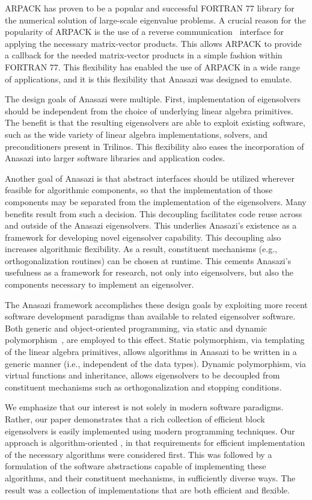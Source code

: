 \documentclass[acmtoms]{acmtrans2m}
\newcounter{algorithm}
\begin{document}
ARPACK has proven to be a popular and successful FORTRAN 77 library for the numerical
solution of large-scale eigenvalue problems. A crucial reason for the popularity of ARPACK
is the use of a reverse communication~\cite[p.~3]{lesy:98} interface for applying the
necessary matrix-vector products. This allows ARPACK to provide a callback for the needed
matrix-vector products in a simple fashion within FORTRAN 77. This flexibility has enabled the use of
ARPACK in a wide range of applications, and it is this flexibility that Anasazi was
designed to emulate.

The design goals of Anasazi were multiple. First, implementation of eigensolvers should be
independent from the choice of underlying linear algebra primitives. The benefit is that
the resulting eigensolvers are able to exploit existing software, such as the wide variety
of linear algebra implementations, solvers, and preconditioners present in Trilinos. This
flexibility also eases the incorporation of Anasazi into larger software libraries and
application codes.

Another goal of Anasazi is that abstract interfaces should be utilized wherever feasible
for algorithmic components, so that the implementation of those components may be
separated from the implementation of the eigensolvers. Many benefits result from such a
decision. This decoupling facilitates code reuse across and outside of the Anasazi
eigensolvers. This underlies Anasazi's existence as a framework for developing novel
eigensolver capability. This decoupling also increases algorithmic flexibility. As a
result, constituent mechanisms (e.g., orthogonalization routines) can be chosen at
runtime. This cements Anasazi's usefulness as a framework for research, not only into
eigensolvers, but also the components necessary to implement an eigensolver.

The Anasazi framework accomplishes these design goals by exploiting more recent software
development paradigms than available to related eigensolver software. Both generic and
object-oriented programming, via static and dynamic polymorphism~\cite[Chapter 14]{VJ02},
are employed to this effect. Static polymorphism, via templating of the linear algebra
primitives, allows algorithms in Anasazi to be written in a generic manner (i.e.,
independent of the data types). Dynamic polymorphism, via virtual functions and
inheritance, allows eigensolvers to be decoupled from constituent mechanisms such as
orthogonalization and stopping conditions. 

We emphasize that our interest is not solely in modern software paradigms. Rather, our
paper demonstrates that a rich collection of efficient block eigensolvers is easily
implemented using modern programming techniques. Our approach is algorithm-oriented
\cite{muov:94}, in that requirements for efficient implementation of the necessary
algorithms were considered first. This was followed by a formulation of the software
abstractions capable of implementing these algorithms, and their constituent mechanisms,
in sufficiently diverse ways. The result was a collection of implementations that are both
efficient and flexible. 
\end{document}

